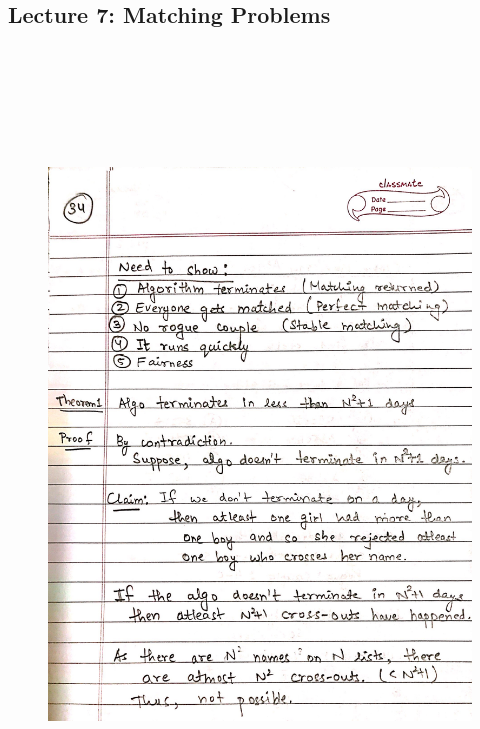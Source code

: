 \newpage
{\color{black} \subsection*{Lecture 7: Matching Problems}}
\begin{figure}[H]
    \centering
    \includegraphics[width=16cm, height=21cm]{"./MIT-6.042J/MIT-6042J-034"}
\end{figure}

